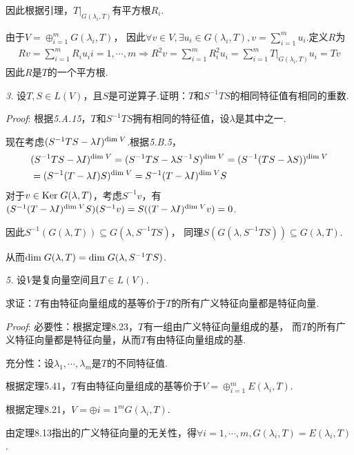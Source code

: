 因此根据引理，\(T|_{G(\lambda_i,T)}\)有平方根\(R_i\).

由于\(V=\oplus_{i=1}^m G(\lambda_i,T)\)，
因此\(\forall v \in V,\exists u_i \in G(\lambda_i,T),v=\sum_{i=1}^m u_i\).定义\(R\)为
    \begin{align*}
        Rv=\sum_{i=1}^m R_iu_i i=1,\cdots,m \Rightarrow
        R^2v=\sum_{i=1}^m R_i^2 u_i=\sum_{i=1}^m T|_{G(\lambda_i,T)}u_i=Tv
    \end{align*}
因此\(R\)是\(T\)的一个平方根.

\newpage

\textit{3.}
设\(T,S \in L(V)\)，且\(S\)是可逆算子.证明：\(T\)和\(S^{-1}TS\)的相同特征值有相同的重数.

\textit{Proof}:
根据\textit{5.A.15}，\(T\)和\(S^{-1}TS\)拥有相同的特征值，设\(\lambda\)是其中之一.

现在考虑\((S^{-1}TS-\lambda I)^{\mathrm{dim \;} V}\).根据\textit{5.B.5}，
    \begin{align*}
        &(S^{-1}TS-\lambda I)^{\mathrm{dim \;} V}=(S^{-1}TS-\lambda S^{-1}S)^{\mathrm{dim \;} V}=(S^{-1}(TS-\lambda S))^{\mathrm{dim \;} V} \\
        &=(S^{-1}(T-\lambda I)S)^{\mathrm{dim \;} V}=S^{-1}(T-\lambda I)^{\mathrm{dim \;} V}S
    \end{align*}
对于\(v \in \mathrm{Ker \;} G(\lambda,T)\)，考虑\(S^{-1}v\)，有
\((S^{-1}(T-\lambda I)^{\mathrm{dim \;} V}S)(S^{-1}v)=S((T-\lambda I)^{\mathrm{dim \;} V}v)=0\).

因此\(S^{-1}(G(\lambda,T)) \subseteq G(\lambda,S^{-1}TS)\)，
同理\(S(G(\lambda,S^{-1}TS)) \subseteq G(\lambda,T)\).

从而\(\mathrm{dim \;} G(\lambda,T)=\mathrm{dim \;} G(\lambda,S^{-1}TS)\).

\hspace*{\fill}

\textit{5.}
设\(V\)是复向量空间且\(T \in L(V)\).

求证：\(T\)有由特征向量组成的基等价于\(T\)的所有广义特征向量都是特征向量.

\textit{Proof}:
必要性：根据定理8.23，\(T\)有一组由广义特征向量组成的基，
而\(T\)的所有广义特征向量都是特征向量，从而\(T\)有由特征向量组成的基.

充分性：设\(\lambda_1,\cdots,\lambda_m\)是\(T\)的不同特征值.

根据定理5.41，\(T\)有由特征向量组成的基等价于\(V=\oplus_{i=1}^m E(\lambda_i,T)\).

根据定理8.21，\(V=\oplus{i=1}^m G(\lambda_i,T)\).

由定理8.13指出的广义特征向量的无关性，得\(\forall i=1,\cdots,m,G(\lambda_i,T)=E(\lambda_i,T)\).

